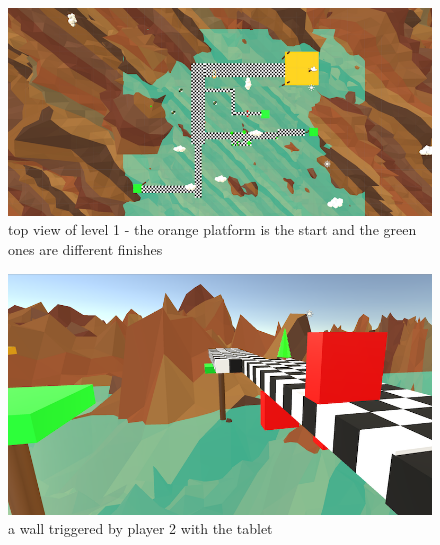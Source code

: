 \documentclass[12pt]{article}
\begin{document}
\begin{figure}[!h]
   \caption{\label{étiquette} top view of level 1 - the orange platform is the start and the green ones are different finishes}
   \includegraphics[scale=0.6]{images/topview.png}
\end{figure}

\begin{figure}[!h]
   \caption{\label{étiquette} a wall triggered by player 2 with the tablet}
   \includegraphics[scale=0.6]{images/wall.png}
\end{figure}
\end{document}
